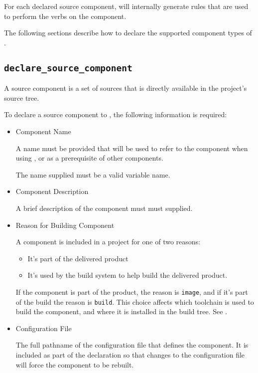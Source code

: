For each declared source component, \lmsbw will internally generate
\makefile rules that are used to perform the \lmsbw verbs on the
component.

The following sections describe how to declare the supported
component types of \lmsbw.

\subsection{\texttt{declare\_source\_component}}

A source component is a set of sources that is directly available in
the project's source tree.

To declare a source component to \lmsbw, the following
information is required:

\begin{itemize}
\item{Component Name}

  A name must be provided that will be used to refer to the component
  when using \lmsbwcmd, or as a prerequisite of other components.

  The name supplied must be a valid \makefile variable name.

\item{Component Description}

  A brief description of the component must must supplied.

\item{Reason for Building Component}

  A component is included in a project for one of two reasons:

  \begin{itemize}
    \item It's part of the delivered product
    \item It's used by the build system to help build the delivered
      product.
  \end{itemize}

  If the component is part of the product, the reason is
  \texttt{image}, and if it's part of the build the reason is
  \texttt{build}.  This choice affects which toolchain is used to
  build the component, and where it is installed in the build tree.
  See .

\item{Configuration File}

  The full pathname of the configuration file that defines the
  component.  It is included as part of the declaration so that
  changes to the configuration file will force the component to be
  rebuilt.


\end{itemize}
